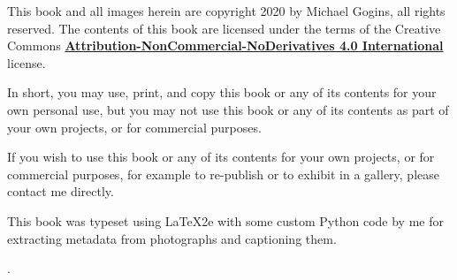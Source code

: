 \clearpage
\noindent This book and all images herein are copyright 2020 by Michael Gogins, all rights reserved. The contents of this book are licensed under the terms of the Creative Commons \href{https://creativecommons.org/licenses/by-nc-nd/4.0/legalcode}{\textbf{Attribution-NonCommercial-NoDerivatives 4.0 International} } license. 

In short, you may use, print, and copy this book or any of its contents for your own personal use, but you may not use this book or any of its contents as part of your own projects, or for commercial purposes.

If you wish to use this book or any of its contents for your own projects, or for commercial purposes, for example to re-publish or to exhibit in a gallery, please contact me directly.

This book was typeset using LaTeX2e with some custom Python code by me for extracting metadata from photographs and captioning them.

.